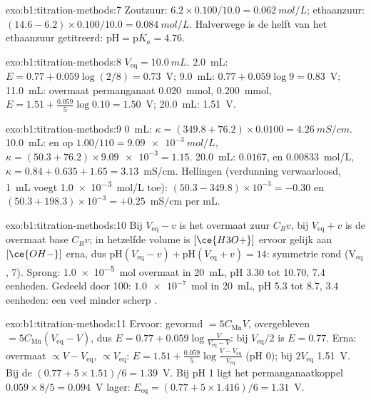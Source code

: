 \begin{solution}{exo:b1:titration-methods:7}
Zoutzuur: $6.2 \times 0.100/10.0 = \qty{0.062}{mol/L}$; ethaanzuur:
$(14.6 - 6.2) \times 0.100/10.0 = \qty{0.084}{mol/L}$. Halverwege is de
helft van het ethaanzuur getitreerd: $\mathrm{pH} = \mathrm{p}K_a = 4.76$.
\end{solution}

\begin{solution}{exo:b1:titration-methods:8}
$V_{\mathrm{eq}} = \qty{10.0}{mL}$. 2.0~mL: $E = 0.77 + 0.059\log(2/8) =
0.73$~V; 9.0~mL: $0.77 + 0.059\log 9 = 0.83$~V; 11.0~mL: overmaat
permanganaat \qty{0.020}{mmol},  \qty{0.200}{mmol}, $E = 1.51 +
\frac{0.059}{5}\log 0.10 = 1.50$~V; 20.0~mL: 1.51~V.
\end{solution}

\begin{solution}{exo:b1:titration-methods:9}
0~mL: $\kappa = (349.8 + 76.2) \times 0.0100 = \qty{4.26}{mS/cm}$.
10.0~mL:  en  op $1.00/110 = \qty{9.09e-3}{mol/L}$,
$\kappa = (50.3 + 76.2) \times \num{9.09e-3} = 1.15$. 20.0~mL: 
$0.0167$,  en  $0.00833$~mol/L, $\kappa = 0.84 + 0.635 + 1.65
= 3.13$~mS/cm. Hellingen (verdunning verwaarloosd, \qty{1}{mL} voegt
\qty{1.0e-3}{mol/L} toe): $(50.3 - 349.8) \times 10^{-3} = -0.30$ en
$(50.3 + 198.3) \times 10^{-3} = +0.25$~mS/cm per mL.
\end{solution}

\begin{solution}{exo:b1:titration-methods:10}
Bij $V_{\mathrm{eq}} - v$ is het overmaat zuur $C_Bv$, bij
$V_{\mathrm{eq}} + v$ is de overmaat base $C_Bv$; in hetzelfde volume is
$[\ce{H3O+}]$ ervoor gelijk aan $[\ce{OH-}]$ erna, dus
$\mathrm{pH}(V_{\mathrm{eq}} - v) +
\mathrm{pH}(V_{\mathrm{eq}} + v) = 14$: symmetrie rond (V$_{\mathrm{eq}}$,
7). Sprong: \qty{1.0e-5}{mol} overmaat in \qty{20}{mL}, pH 3.30 tot
10.70, 7.4 eenheden. Gedeeld door 100: $\num{1.0e-7}$~mol in
\qty{20}{mL}, pH 5.3 tot 8.7, 3.4 eenheden: een veel minder scherp
.
\end{solution}

\begin{solution}{exo:b1:titration-methods:11}
Ervoor: gevormd  $= 5C_{\mathrm{Mn}}V$, overgebleven  $=
5C_{\mathrm{Mn}}(V_{\mathrm{eq}} - V)$, dus $E = 0.77 + 0.059\log\frac{V}{V_{\mathrm{eq}}
- V}$: bij $V_{\mathrm{eq}}/2$ is $E = 0.77$. Erna: overmaat  $\propto
V - V_{\mathrm{eq}}$,  $\propto V_{\mathrm{eq}}$: $E = 1.51 +
\frac{0.059}{5}\log\frac{V - V_{\mathrm{eq}}}{V_{\mathrm{eq}}}$ (pH 0); bij
$2V_{\mathrm{eq}}$ 1.51~V. Bij de  $(0.77 + 5 \times 1.51)/6 =
1.39$~V. Bij pH 1 ligt het permanganaatkoppel $0.059 \times 8/5 =
0.094$~V lager: $E_{\mathrm{eq}} = (0.77 + 5 \times 1.416)/6 = 1.31$~V.
\end{solution}

